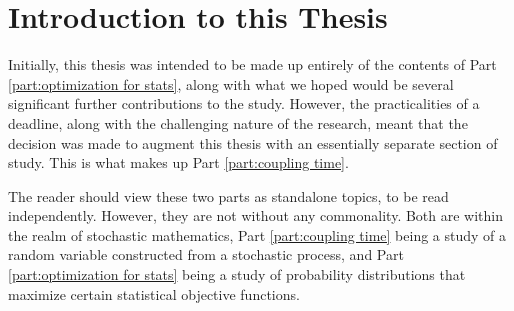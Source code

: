 \chapter{Introduction to this Thesis}
\label{Ch:ThesisIntro}


Initially, this thesis was intended to be made up entirely of the contents of Part \ref{part:optimization for stats}, along with what we hoped would be several significant further contributions to the study. However, the practicalities of a deadline, along with the challenging nature of the research, meant that the decision was made to augment this thesis with an essentially separate section of study. This is what makes up Part \ref{part:coupling time}.

The reader should view these two parts as standalone topics, to be read independently. However, they are not without any commonality. Both are within the realm of stochastic mathematics, Part \ref{part:coupling time} being a study of a random variable constructed from a stochastic process, and Part \ref{part:optimization for stats} being a study of probability distributions that maximize certain statistical objective functions. 


